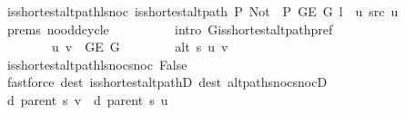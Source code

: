\begin{isabellebody}
\ is{\isacharunderscore}{\kern0pt}shortest{\isacharunderscore}{\kern0pt}alt{\isacharunderscore}{\kern0pt}path{\isacharunderscore}{\kern0pt}l{\isacharunderscore}{\kern0pt}snoc{\isacharcolon}{\kern0pt}\ {\isachardoublequoteopen}is{\isacharunderscore}{\kern0pt}shortest{\isacharunderscore}{\kern0pt}alt{\isacharunderscore}{\kern0pt}path\ P{\isacharprime}{\kern0pt}{\isacharprime}{\kern0pt}\ {\isacharparenleft}{\kern0pt}Not\ {\isasymcirc}\ P{\isacharprime}{\kern0pt}{\isacharprime}{\kern0pt}{\isacharparenright}{\kern0pt}\ {\isacharparenleft}{\kern0pt}G{\isachardot}{\kern0pt}E\ G{\isacharparenright}{\kern0pt}\ {\isacharparenleft}{\kern0pt}l\ {\isacharat}{\kern0pt}\ {\isacharbrackleft}{\kern0pt}u{\isacharbrackright}{\kern0pt}{\isacharparenright}{\kern0pt}\ src\ u{\isachardoublequoteclose}\isanewline
\ \ \ \ \ \ \ \ \isamarkupfalse%
\ {\isachardoublequoteopen}{}{\isachardot}{\kern0pt}prems{\isachardoublequoteclose}{\isacharparenleft}{\kern0pt}{}{\isacharparenright}{\kern0pt}\ no{\isacharunderscore}{\kern0pt}odd{\isacharunderscore}{\kern0pt}cycle\isanewline
\ \ \ \ \ \ \ \ \isamarkupfalse%
\ {\isacharparenleft}{\kern0pt}intro\ G{\isachardot}{\kern0pt}is{\isacharunderscore}{\kern0pt}shortest{\isacharunderscore}{\kern0pt}alt{\isacharunderscore}{\kern0pt}path{\isacharunderscore}{\kern0pt}pref{\isacharparenright}{\kern0pt}\isanewline
\ \ \ \ \ \ \isamarkupfalse%
\isanewline
\ \ \ \ \ \ \ \ {\isachardoublequoteopen}{\isacharbraceleft}{\kern0pt}u{\isacharcomma}{\kern0pt}\ v{\isacharbraceright}{\kern0pt}\ {\isasymin}\ G{\isachardot}{\kern0pt}E\ G{\isachardoublequoteclose}\isanewline
\ \ \ \ \ \ \ \ {\isachardoublequoteopen}alt\ s\ u\ v{\isachardoublequoteclose}\isanewline
\ \ \ \ \ \ \ \ \isamarkupfalse%
\ is{\isacharunderscore}{\kern0pt}shortest{\isacharunderscore}{\kern0pt}alt{\isacharunderscore}{\kern0pt}path{\isacharunderscore}{\kern0pt}l{\isacharunderscore}{\kern0pt}snoc{\isacharunderscore}{\kern0pt}snoc\ False\isanewline
\ \ \ \ \ \ \ \ \isamarkupfalse%
\ {\isacharparenleft}{\kern0pt}fastforce\ dest{\isacharcolon}{\kern0pt}\ is{\isacharunderscore}{\kern0pt}shortest{\isacharunderscore}{\kern0pt}alt{\isacharunderscore}{\kern0pt}pathD{\isacharparenleft}{\kern0pt}{}{\isacharparenright}{\kern0pt}\ dest{\isacharcolon}{\kern0pt}\ alt{\isacharunderscore}{\kern0pt}path{\isacharunderscore}{\kern0pt}snoc{\isacharunderscore}{\kern0pt}snocD{\isacharparenright}{\kern0pt}{\isacharplus}{\kern0pt}\isanewline
\ \ \ \ \ \ \isamarkupfalse%
\ {\isachardoublequoteopen}d\ {\isacharparenleft}{\kern0pt}parent\ s{\isacharparenright}{\kern0pt}\ v\ {\isasymle}\ d\ {\isacharparenleft}{\kern0pt}parent\ s{\isacharparenright}{\kern0pt}\ u\ {\isacharplus}{\kern0pt}\ {}{\isachardoublequoteclose}\isanewline

\end{isabellebody}
